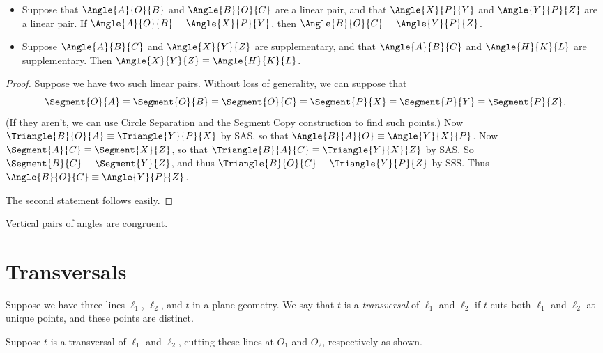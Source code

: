 \documentclass{article}
\begin{document}

\begin{prop} \mbox{}
\begin{itemize}
\item Suppose that $\Angle{A}{O}{B}$ and $\Angle{B}{O}{C}$ are a linear pair, and that $\Angle{X}{P}{Y}$ and $\Angle{Y}{P}{Z}$ are a linear pair. If $\Angle{A}{O}{B} \equiv \Angle{X}{P}{Y}$, then $\Angle{B}{O}{C} \equiv \Angle{Y}{P}{Z}$.
\item Suppose $\Angle{A}{B}{C}$ and $\Angle{X}{Y}{Z}$ are supplementary, and that $\Angle{A}{B}{C}$ and $\Angle{H}{K}{L}$ are supplementary. Then $\Angle{X}{Y}{Z} \equiv \Angle{H}{K}{L}$.
\end{itemize}
\end{prop}

\begin{proof}
Suppose we have two such linear pairs. Without loss of generality, we can suppose that \[ \Segment{O}{A} \equiv \Segment{O}{B} \equiv \Segment{O}{C} \equiv \Segment{P}{X} \equiv \Segment{P}{Y} \equiv \Segment{P}{Z}. \] (If they aren't, we can use Circle Separation and the Segment Copy construction to find such points.) Now $\Triangle{B}{O}{A} \equiv \Triangle{Y}{P}{X}$ by SAS, so that $\Angle{B}{A}{O} \equiv \Angle{Y}{X}{P}$. Now $\Segment{A}{C} \equiv \Segment{X}{Z}$, so that $\Triangle{B}{A}{C} \equiv \Triangle{Y}{X}{Z}$ by SAS. So $\Segment{B}{C} \equiv \Segment{Y}{Z}$, and thus $\Triangle{B}{O}{C} \equiv \Triangle{Y}{P}{Z}$ by SSS. Thus $\Angle{B}{O}{C} \equiv \Angle{Y}{P}{Z}$.

The second statement follows easily.
\end{proof}

\begin{cor}
Vertical pairs of angles are congruent.
\end{cor}

\section*{Transversals}

\begin{dfn}[Transversal]
Suppose we have three lines $\ell_1$, $\ell_2$, and $t$ in a plane geometry. We say that $t$ is a \emph{transversal} of $\ell_1$ and $\ell_2$ if $t$ cuts both $\ell_1$ and $\ell_2$ at unique points, and these points are distinct.
\end{dfn}

Suppose $t$ is a transversal of $\ell_1$ and $\ell_2$, cutting these lines at $O_1$ and $O_2$, respectively as shown.
\end{document}
